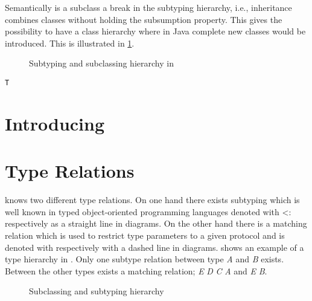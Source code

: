 Semantically is a subclass a break in the subtyping hierarchy, i.e., inheritance
combines classes without holding the subsumption property. This gives \ooplss
the possibility to have a class hierarchy where in Java complete new classes
would be introduced. This is illustrated in \cref{fig:inheritHierarchy}.

\begin{figure}[h]
	\centering
	\caption{Subtyping and subclassing hierarchy in \ooplss}
	\label{fig:inheritHierarchy}
\end{figure}



\begin{lstlisting}[language=ooplss,caption=Subtyping in \ooplss,label="lst:subtypeOf"]
T
\end{lstlisting}


\section{Introducing \mytype}


\section{Type Relations}
\ooplss knows two different type relations. On one hand there exists
subtyping which is well known in typed object-oriented programming
languages denoted with <: respectively as a straight line in diagrams. On
the other hand there is a matching relation which is used to restrict type
parameters to a given protocol and is denoted with \match respectively
with a dashed line in diagrams.  shows an example of
a type hierarchy in \ooplss. Only one subtype relation between type \emph{A}
and \emph{B} exists. Between the other types exists a matching relation; \emph{E}
\match \emph{D} \match \emph{C} \match \emph{A} and \emph{E} \match \emph{B}.


\begin{figure}[h]
	\centering
	\caption{Subclassing and subtyping hierarchy}
	\label{fig:hierarchy}
\end{figure}

